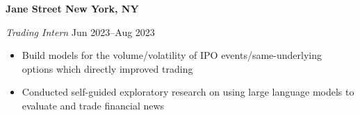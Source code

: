 \textbf{Jane Street \hfill New York, NY}\par

\textit{Trading Intern} \hfill Jun 2023--Aug 2023
\begin{itemize}
	\item Build models for the volume/volatility of IPO events/same-underlying options which directly improved trading
	\item Conducted self-guided exploratory research on using large language models to evaluate and trade financial news
\end{itemize}